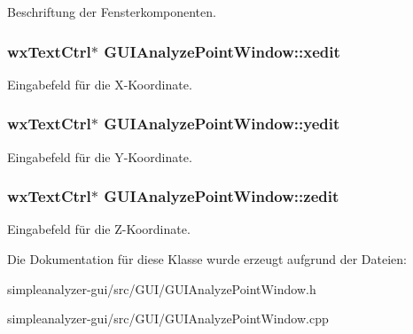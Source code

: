 Beschriftung der Fensterkomponenten. \hypertarget{classGUIAnalyzePointWindow_a4c3d50b2c5c38b8b757cdb1c04ea83b6}{
\subsubsection[{xedit}]{\setlength{\rightskip}{0pt plus 5cm}wx\-Text\-Ctrl$\ast$ G\-U\-I\-Analyze\-Point\-Window\-::xedit\hspace{0.3cm}{\ttfamily [private]}}}\label{classGUIAnalyzePointWindow_a4c3d50b2c5c38b8b757cdb1c04ea83b6}
Eingabefeld für die X-\/\-Koordinate. \hypertarget{classGUIAnalyzePointWindow_ac4352df05ac2a001551801a90fc8bc42}{
\subsubsection[{yedit}]{\setlength{\rightskip}{0pt plus 5cm}wx\-Text\-Ctrl$\ast$ G\-U\-I\-Analyze\-Point\-Window\-::yedit\hspace{0.3cm}{\ttfamily [private]}}}\label{classGUIAnalyzePointWindow_ac4352df05ac2a001551801a90fc8bc42}
Eingabefeld für die Y-\/\-Koordinate. \hypertarget{classGUIAnalyzePointWindow_a173e639b35cc6c18a74fb746b8664c8c}{
\subsubsection[{zedit}]{\setlength{\rightskip}{0pt plus 5cm}wx\-Text\-Ctrl$\ast$ G\-U\-I\-Analyze\-Point\-Window\-::zedit\hspace{0.3cm}{\ttfamily [private]}}}\label{classGUIAnalyzePointWindow_a173e639b35cc6c18a74fb746b8664c8c}
Eingabefeld für die Z-\/\-Koordinate. 

Die Dokumentation für diese Klasse wurde erzeugt aufgrund der Dateien\-:\begin{DoxyCompactItemize}
\item 
simpleanalyzer-\/gui/src/\-G\-U\-I/G\-U\-I\-Analyze\-Point\-Window.\-h\item 
simpleanalyzer-\/gui/src/\-G\-U\-I/G\-U\-I\-Analyze\-Point\-Window.\-cpp\end{DoxyCompactItemize}
